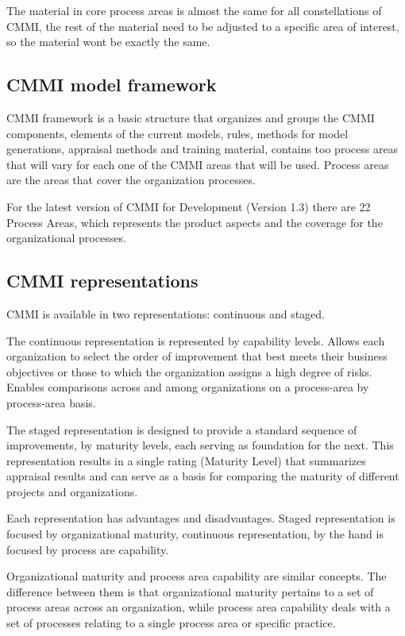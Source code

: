 The material in core process areas is almost the same for all constellations of CMMI, the rest of the material need to be adjusted to a specific area of interest, so the material wont be exactly the same.



\subsection{CMMI model framework}
CMMI framework is a basic structure that organizes and groups the CMMI components, elements of the current models, rules, methods for model generations, appraisal methods and training material, contains too process areas that will vary for each one of the CMMI areas that will be used. Process areas are the areas that cover the organization processes.

For the latest version of CMMI for Development (Version 1.3) there are 22 Process Areas, which represents the product aspects and the coverage for the organizational processes.


\subsection{CMMI representations}

CMMI is available in two representations: continuous and staged.

The continuous representation is represented by capability levels. Allows each organization to select the order of improvement that best meets their business objectives or those to which the organization assigns a high degree of risks. Enables comparisons across and among organizations on a process-area by process-area basis.


The staged representation is designed to provide a standard sequence of improvements, by maturity levels, each serving as foundation for the next. This representation results in a single rating (Maturity Level) that summarizes appraisal results and can serve as a basis for comparing the maturity of different projects and organizations.

Each representation has advantages and disadvantages. Staged representation is focused by organizational maturity, continuous representation, by the hand is focused by process are capability.

Organizational maturity and process area capability are similar concepts. The difference between them is that organizational maturity pertains to a set of process areas across an organization, while process area capability deals with a set of processes relating to a single process area or specific practice.

